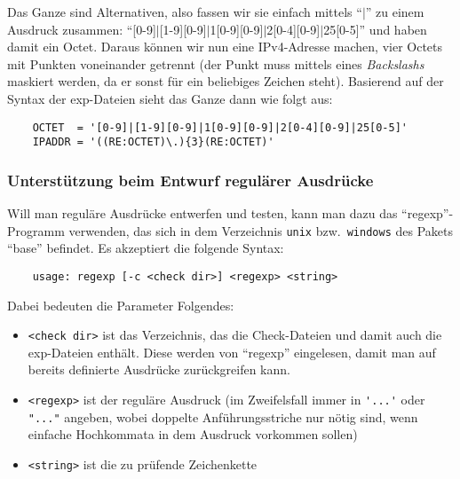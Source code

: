 Das Ganze sind Alternativen, also fassen wir sie einfach mittels "`$|$"' zu
einem Ausdruck zusammen: "`[0-9]$|$[1-9][0-9]$|$1[0-9][0-9]$|$2[0-4][0-9]$|$25[0-5]"' und haben
damit ein Octet. Daraus können wir nun eine IPv4-Adresse machen, vier
Octets mit Punkten voneinander getrennt (der Punkt muss mittels eines \emph{Backslashs}
maskiert werden, da er sonst für ein beliebiges Zeichen
steht). Basierend auf der Syntax der exp-Dateien sieht das Ganze dann
wie folgt aus:

\begin{example}
\begin{verbatim}
    OCTET  = '[0-9]|[1-9][0-9]|1[0-9][0-9]|2[0-4][0-9]|25[0-5]'
    IPADDR = '((RE:OCTET)\.){3}(RE:OCTET)'
\end{verbatim}
\end{example}


\subsubsection{Unterstützung beim Entwurf regulärer Ausdrücke}

Will man reguläre Ausdrücke entwerfen und testen, kann man dazu das
"`regexp"'-Programm verwenden, das sich in dem Verzeichnis \texttt{unix}
bzw.\ \texttt{windows} des Pakets "`base"' befindet. Es akzeptiert die folgende
Syntax:

\begin{example}
\begin{verbatim}
    usage: regexp [-c <check dir>] <regexp> <string>
\end{verbatim}
\end{example}

Dabei bedeuten die Parameter Folgendes:
\begin{itemize}
\item \texttt{<check dir>} ist das Verzeichnis, das die Check-Dateien und damit
auch die exp-Dateien enthält. Diese werden von "`regexp"' eingelesen,
damit man auf bereits definierte Ausdrücke zurückgreifen kann.



\item \texttt{<regexp>} ist der reguläre Ausdruck (im Zweifelsfall immer in \verb+'...'+
oder \verb+"..."+ angeben, wobei doppelte Anführungsstriche nur nötig sind, wenn
einfache Hochkommata in dem Ausdruck vorkommen sollen)


\item \texttt{<string>} ist die zu prüfende Zeichenkette
\end{itemize}

